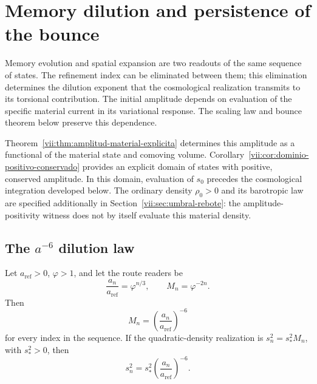 
\section{Memory dilution and persistence of the bounce}
\label{vii:sec:dilucion-rebote}

Memory evolution and spatial expansion are two readouts of
the same sequence of states. The refinement index can be eliminated
between them; this elimination determines the dilution exponent that the
cosmological realization transmits to its torsional contribution.
The initial amplitude depends on evaluation of the specific material
current in its variational response. The scaling law and bounce
theorem below preserve this dependence.

Theorem~\ref{vii:thm:amplitud-material-explicita} determines this
amplitude as a functional of the material state and comoving volume.
Corollary~\ref{vii:cor:dominio-positivo-conservado} provides
an explicit domain of states with positive, conserved amplitude.
In this domain, evaluation of \(s_0\) precedes the cosmological
integration developed below. The ordinary density
\(\rho_0>0\) and its barotropic law are specified additionally in
Section~\ref{vii:sec:umbral-rebote}: the amplitude-positivity witness
does not by itself evaluate this material density.

\subsection{The \texorpdfstring{\(a^{-6}\)}{a to the power -6} dilution law}
\label{vii:sec:dilucion}

\begin{proposition}
\label{vii:prop:dilucion}
Let \(a_{\mathrm{ref}}>0\), \(\varphi>1\), and let the route readers be
\[
 \frac{a_n}{a_{\mathrm{ref}}}=\varphi^{n/3},\qquad
 M_n=\varphi^{-2n}.
\]
Then
\[
 M_n=\left(\frac{a_n}{a_{\mathrm{ref}}}\right)^{-6}
\]
for every index in the sequence. If the quadratic-density realization
is \(s_n^2=s_*^2M_n\), with \(s_*^2>0\), then
\[
 s_n^2=s_*^2\left(\frac{a_n}{a_{\mathrm{ref}}}\right)^{-6}.
\]
\end{proposition}

